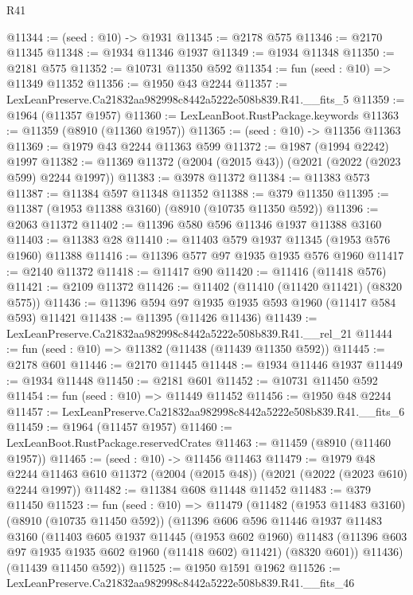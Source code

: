 \begin{lexlean}{R41}
\begin{coremodule}
@11344 := (seed : @10) -> @1931
@11345 := @2178 @575
@11346 := @2170 @11345
@11348 := @1934 @11346 @1937
@11349 := @1934 @11348
@11350 := @2181 @575
@11352 := @10731 @11350 @592
@11354 := fun (seed : @10) => @11349 @11352
@11356 := @1950 @43 @2244
@11357 := LexLeanPreserve.Ca21832aa982998c8442a5222e508b839.R41.__fits_5
@11359 := @1964 (@11357 @1957)
@11360 := LexLeanBoot.RustPackage.keywords
@11363 := @11359 (@8910 (@11360 @1957))
@11365 := (seed : @10) -> @11356 @11363
@11369 := @1979 @43 @2244 @11363 @599
@11372 := @1987 (@1994 @2242) @1997
@11382 := @11369 @11372 (@2004 (@2015 @43)) (@2021 (@2022 (@2023 @599) @2244 @1997))
@11383 := @3978 @11372
@11384 := @11383 @573
@11387 := @11384 @597 @11348 @11352
@11388 := @379 @11350
@11395 := @11387 (@1953 @11388 @3160) (@8910 (@10735 @11350 @592))
@11396 := @2063 @11372
@11402 := @11396 @580 @596 @11346 @1937 @11388 @3160
@11403 := @11383 @28
@11410 := @11403 @579 @1937 @11345 (@1953 @576 @1960) @11388
@11416 := @11396 @577 @97 @1935 @1935 @576 @1960
@11417 := @2140 @11372
@11418 := @11417 @90
@11420 := @11416 (@11418 @576)
@11421 := @2109 @11372
@11426 := @11402 (@11410 (@11420 @11421) (@8320 @575))
@11436 := @11396 @594 @97 @1935 @1935 @593 @1960 (@11417 @584 @593) @11421
@11438 := @11395 (@11426 @11436)
@11439 := LexLeanPreserve.Ca21832aa982998c8442a5222e508b839.R41.__rel_21
@11444 := fun (seed : @10) => @11382 (@11438 (@11439 @11350 @592))
@11445 := @2178 @601
@11446 := @2170 @11445
@11448 := @1934 @11446 @1937
@11449 := @1934 @11448
@11450 := @2181 @601
@11452 := @10731 @11450 @592
@11454 := fun (seed : @10) => @11449 @11452
@11456 := @1950 @48 @2244
@11457 := LexLeanPreserve.Ca21832aa982998c8442a5222e508b839.R41.__fits_6
@11459 := @1964 (@11457 @1957)
@11460 := LexLeanBoot.RustPackage.reservedCrates
@11463 := @11459 (@8910 (@11460 @1957))
@11465 := (seed : @10) -> @11456 @11463
@11479 := @1979
    @48
    @2244
    @11463
    @610
    @11372
    (@2004 (@2015 @48))
    (@2021 (@2022 (@2023 @610) @2244 @1997))
@11482 := @11384 @608 @11448 @11452
@11483 := @379 @11450
@11523 := fun (seed : @10) =>
  @11479
    (@11482
      (@1953 @11483 @3160)
      (@8910 (@10735 @11450 @592))
      (@11396
        @606
        @596
        @11446
        @1937
        @11483
        @3160
        (@11403
          @605
          @1937
          @11445
          (@1953 @602 @1960)
          @11483
          (@11396 @603 @97 @1935 @1935 @602 @1960 (@11418 @602) @11421)
          (@8320 @601))
        @11436)
      (@11439 @11450 @592))
@11525 := @1950 @1591 @1962
@11526 := LexLeanPreserve.Ca21832aa982998c8442a5222e508b839.R41.__fits_46

\end{coremodule}
\end{lexlean}
